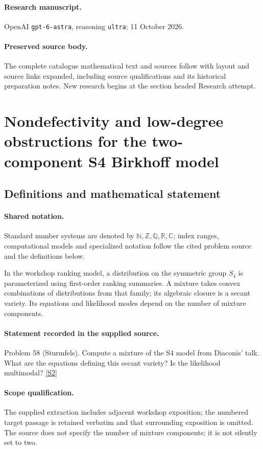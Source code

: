 \documentclass[11pt]{article}
\begin{document}
\paragraph{Research manuscript.} OpenAI \texttt{gpt-6-astra}, reasoning \texttt{ultra}; 11 October 2026.
\paragraph{Preserved source body.} The complete catalogue mathematical text and sources follow with layout and source links expanded, including source qualifications and its historical preparation notes. New research begins at the section headed Research attempt.

\section{Nondefectivity and low-degree obstructions for the two-component S4 Birkhoff model}\label{statement}

\subsection{Definitions and mathematical statement}

\paragraph{Shared notation.}Standard number systems are denoted by $\mathbb N,\mathbb Z,\mathbb Q,\mathbb R,\mathbb C$; index ranges, computational models and specialized notation follow the cited problem source and the definitions below.


In the workshop ranking model, a distribution on the symmetric group $S_4$ is parameterized using first-order ranking summaries. A mixture takes convex combinations of distributions from that family; its algebraic closure is a secant variety. Its equations and likelihood modes depend on the number of mixture components.
\paragraph{Statement recorded in the supplied source.}
Problem 58 (Sturmfels). Compute a mixture of the S4 model from Diaconis' talk. What are the equations defining this secant variety? Is the likelihood multimodal? \href{https://aimath.org/WWN/compalgstat/compalgstat.pdf}{[S2]}
\paragraph{Scope qualification.}
The supplied extraction includes adjacent workshop exposition; the numbered target passage is retained verbatim and that surrounding exposition is omitted. The source does not specify the number of mixture components; it is not silently set to two.
\end{document}
